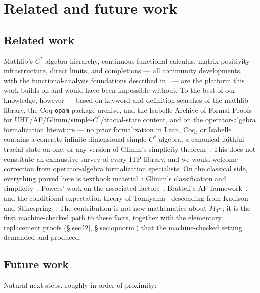 \documentclass[11pt,a4paper]{amsart}
\theoremstyle{plain}
\theoremstyle{definition}
\begin{document}
\section{Related and future work}\label{sec:related}

\subsection{Related work}

Mathlib's $C^*$-algebra hierarchy, continuous functional calculus, matrix
positivity infrastructure, direct limits, and completions --- all
community developments, with the functional-analysis foundations described
in~\cite{dupuis-lewis-macbeth2022} --- are the platform this work builds
on and would have been impossible without. To the best of our knowledge,
however --- based on keyword and definition searches of the mathlib
library, the Coq \texttt{opam} package archive, and the Isabelle Archive
of Formal Proofs for UHF/AF/Glimm/simple-$C^*$/tracial-state content, and
on the operator-algebra formalization literature --- no prior
formalization in Lean, Coq, or Isabelle contains a concrete
infinite-dimensional simple $C^*$-algebra, a canonical faithful tracial
state on one, or any version of Glimm's simplicity
theorem~\cite{glimm1960}. This does not constitute an exhaustive survey of
every ITP library, and we would welcome correction from operator-algebra
formalization specialists. On the classical
side, everything proved here is textbook
material~\cite{davidson1996, blackadar2006, takesaki1979}: Glimm's
classification and simplicity~\cite{glimm1960}, Powers' work on the
associated factors~\cite{powers1967}, Bratteli's AF
framework~\cite{bratteli1972}, and the conditional-expectation theory of
Tomiyama~\cite{tomiyama1957} descending from
Kadison~\cite{kadison1952} and Stinespring~\cite{stinespring1955}. The
contribution is not new mathematics about $M_{3^\infty}$; it is the first
machine-checked path to these facts, together with the elementary
replacement proofs (\S\ref{sec:l2}, \S\ref{sec:opnorm}) that the
machine-checked setting demanded and produced.

\subsection{Future work}

Natural next steps, roughly in order of proximity:
\end{document}
